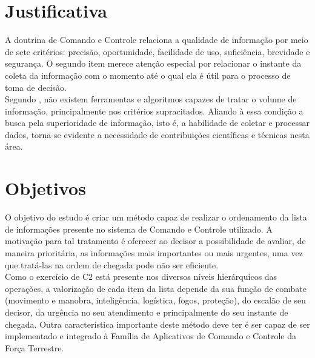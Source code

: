 \documentclass[a4paper,12pt]{article}
\begin{document}
\section{Justificativa}
A doutrina de Comando e Controle \cite{Brasil} relaciona a qualidade de informação por meio de sete critérios: precisão, oportunidade, facilidade de uso,
suficiência, brevidade e segurança. O segundo item merece atenção especial por relacionar o instante da coleta da informação com o momento até o qual ela é 
útil para o processo de toma de decisão.\\
\indent Segundo \cite{Savas 2014}, não existem ferramentas e algoritmos capazes de tratar o volume de informação, principalmente nos critérios supracitados. Aliando à
essa condição a busca pela superioridade de informação, isto é, a habilidade de coletar e processar dados, torna-se evidente a necessidade de
contribuições científicas e técnicas nesta área.

\section{Objetivos}
\indent O objetivo do estudo é criar um método capaz de realizar o ordenamento da lista de informações presente no sistema de 
Comando e Controle utilizado. A motivação para tal tratamento é oferecer ao decisor a possibilidade de avaliar, de maneira 
prioritária, as informações mais importantes ou mais urgentes, uma vez que tratá-las na ordem de chegada pode não ser 
eficiente.\\
\indent Como o exercício de C2 está presente nos diversos níveis hierárquicos das operações, a valorização de cada item 
da lista depende da sua função de combate (movimento e manobra, inteligência, logística, fogos, proteção), do escalão de 
seu decisor, da urgência no seu atendimento e principalmente do seu instante de chegada. Outra característica importante 
deste método deve ter é ser capaz de ser implementado e integrado à Família de Aplicativos de Comando e Controle da 
Força Terrestre.\\
\end{document}
